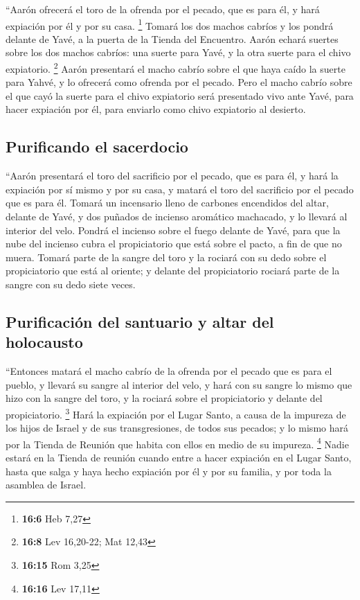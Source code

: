 \begin{paracol}{2}
 ``Aarón ofrecerá el toro de la ofrenda por el pecado, que
es para él, y hará expiación por él y por su casa. \footnote{\textbf{16:6}
  Heb 7,27}  Tomará los dos machos cabríos y los pondrá
delante de Yavé, a la puerta de la Tienda del Encuentro. 
Aarón echará suertes sobre los dos machos cabríos: una suerte para Yavé,
y la otra suerte para el chivo expiatorio. \footnote{\textbf{16:8} Lev
  16,20-22; Mat 12,43}  Aarón presentará el macho cabrío
sobre el que haya caído la suerte para Yahvé, y lo ofrecerá como ofrenda
por el pecado.  Pero el macho cabrío sobre el que cayó la
suerte para el chivo expiatorio será presentado vivo ante Yavé, para
hacer expiación por él, para enviarlo como chivo expiatorio al desierto.

\hypertarget{purificando-el-sacerdocio}{%
\subsection{Purificando el sacerdocio}\label{purificando-el-sacerdocio}}

 ``Aarón presentará el toro del sacrificio por el pecado,
que es para él, y hará la expiación por sí mismo y por su casa, y matará
el toro del sacrificio por el pecado que es para él. 
Tomará un incensario lleno de carbones encendidos del altar, delante de
Yavé, y dos puñados de incienso aromático machacado, y lo llevará al
interior del velo.  Pondrá el incienso sobre el fuego
delante de Yavé, para que la nube del incienso cubra el propiciatorio
que está sobre el pacto, a fin de que no muera.  Tomará
parte de la sangre del toro y la rociará con su dedo sobre el
propiciatorio que está al oriente; y delante del propiciatorio rociará
parte de la sangre con su dedo siete veces.

\hypertarget{purificaciuxf3n-del-santuario-y-altar-del-holocausto}{%
\subsection{Purificación del santuario y altar del
holocausto}\label{purificaciuxf3n-del-santuario-y-altar-del-holocausto}}

 ``Entonces matará el macho cabrío de la ofrenda por el
pecado que es para el pueblo, y llevará su sangre al interior del velo,
y hará con su sangre lo mismo que hizo con la sangre del toro, y la
rociará sobre el propiciatorio y delante del propiciatorio. \footnote{\textbf{16:15}
  Rom 3,25}  Hará la expiación por el Lugar Santo, a
causa de la impureza de los hijos de Israel y de sus transgresiones, de
todos sus pecados; y lo mismo hará por la Tienda de Reunión que habita
con ellos en medio de su impureza. \footnote{\textbf{16:16} Lev 17,11}
 Nadie estará en la Tienda de reunión cuando entre a
hacer expiación en el Lugar Santo, hasta que salga y haya hecho
expiación por él y por su familia, y por toda la asamblea de Israel.


\end{paracol}

